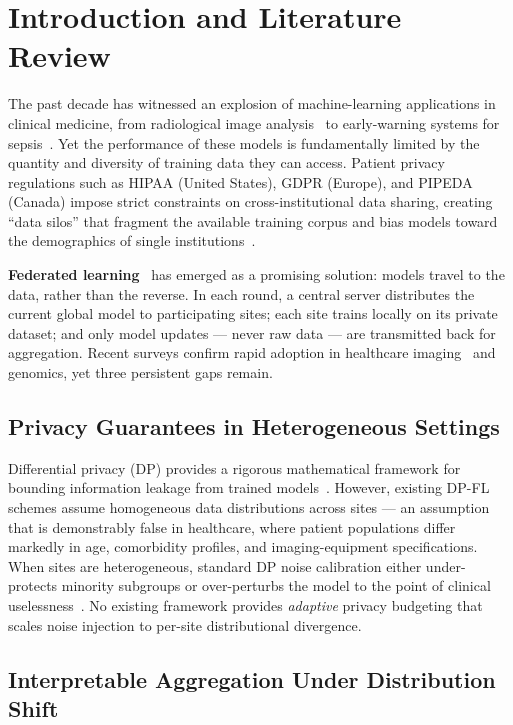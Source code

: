 \section{Introduction and Literature Review}

The past decade has witnessed an explosion of machine-learning applications in clinical
medicine, from radiological image analysis~\cite{esteva2017} to early-warning systems for
sepsis~\cite{reynolds2024}. Yet the performance of these models is fundamentally limited by
the quantity and diversity of training data they can access. Patient privacy regulations
such as HIPAA (United States), GDPR (Europe), and PIPEDA (Canada) impose strict constraints
on cross-institutional data sharing, creating ``data silos'' that fragment the available
training corpus and bias models toward the demographics of single institutions~\cite{rieke2020}.

\textbf{Federated learning}~\cite{mcmahan2017} has emerged as a promising solution: models
travel to the data, rather than the reverse. In each round, a central server distributes the
current global model to participating sites; each site trains locally on its private dataset;
and only model updates — never raw data — are transmitted back for aggregation. Recent
surveys confirm rapid adoption in healthcare imaging~\cite{sheller2020} and genomics, yet
three persistent gaps remain.

\subsection{Privacy Guarantees in Heterogeneous Settings}

Differential privacy (DP) provides a rigorous mathematical framework for bounding
information leakage from trained models~\cite{abadi2016}. However, existing DP-FL schemes
assume homogeneous data distributions across sites — an assumption that is demonstrably
false in healthcare, where patient populations differ markedly in age, comorbidity profiles,
and imaging-equipment specifications. When sites are heterogeneous, standard DP noise
calibration either under-protects minority subgroups or over-perturbs the model to the point
of clinical uselessness~\cite{li2020}. No existing framework provides \emph{adaptive}
privacy budgeting that scales noise injection to per-site distributional divergence.

\subsection{Interpretable Aggregation Under Distribution Shift}

